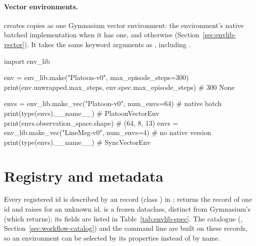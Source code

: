 \paragraph{Vector environments.} 
creates  copies as one Gymnasium vector environment: the
environment's native batched implementation when it has one, and
 otherwise
(Section~\ref{sec:envlib-vector}). It takes the same keyword arguments as
, including .

\begin{pycode}
import env_lib

env = env_lib.make("Platoon-v0", max_episode_steps=300)
print(env.unwrapped.max_steps, env.spec.max_episode_steps)   # 300 None

envs = env_lib.make_vec("Platoon-v0", num_envs=64)      # native batch
print(type(envs).__name__)                              # PlatoonVectorEnv
print(envs.observation_space.shape)                     # (64, 8, 13)
envs = env_lib.make_vec("LineMsg-v0", num_envs=4)       # no native version
print(type(envs).__name__)                              # SyncVectorEnv
\end{pycode}

\section{Registry and metadata}\label{sec:envlib-registry}

Every registered id is described by an  record (class
) in ;
 returns the record of one id and raises
 for an unknown id.  is a frozen dataclass,
distinct from Gymnasium's  (which
 returns); its fields are listed in
Table~\ref{tab:envlib-spec}. The catalogue (,
Section~\ref{sec:workflow-catalog}) and the  command line are
built on these records, so an environment can be selected by its properties
instead of by name.

